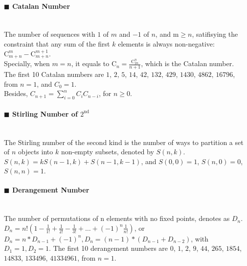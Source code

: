 ﻿\documentclass[10pt]{article}
\begin{document}
{\paragraph{$\blacksquare$ Catalan Number}
\noindent \\
The number of sequences with $1$ of $m$ and $-1$ of $n$, and m$\ge n$, satifisying the constraint that any sum of the first $k$ elements is always non-negative: $\mathrm{C}_{m+n}^{m}-\mathrm{C}_{m+n}^{m+1}$. \\
Specially, when $m=n$, it equals to $\mathrm{C}_{n}=\frac{\mathrm{C}_{2n}^{n}}{n+1}$, which is the Catalan number. \\
The first 10 Catalan numbers are $1$, $2$, $5$, $14$, $42$, $132$, $429$, $1430$, $4862$, $16796$, from $n=1$, and $C_0=1$. \\
Besides, $C_{n+1}=\sum_{i=0}^{n}C_{i}C_{n-i}$, for $n\ge 0$.
\paragraph{$\blacksquare$ Stirling Number of $\mathrm{2^{nd}}$}
\noindent \\
The Stirling number of the second kind is the number of ways to partition a set of $n$ objects into $k$ non-empty subsets, denoted by $S(n,k)$. \\
$S(n,k)=kS(n-1,k)+S(n-1,k-1)$, and $S(0,0)=1$, $S(n,0)=0$, $S(n,n)=1$.
\paragraph{$\blacksquare$ Derangement Number}
\noindent \\
The number of permutations of n elements with no fixed points, denotes as $D_n$. \\
$D_n=n!(1-\frac{1}{1!}+\frac{1}{2!}-\frac{1}{3!}+\ldots +{(-1)}^n\frac{1}{n!})$, or $D_n=n*D_{n-1}+{(-1)}^n,D_n=(n-1)*(D_{n-1}+D_{n-2})$, with $D_1=1,D_2=1$.
The first 10 derangement numbers are $0$, $1$, $2$, $9$, $44$, $265$, $1854$, $14833$, $133496$, $41334961$, from $n=1$.
% 
}
\end{document}
